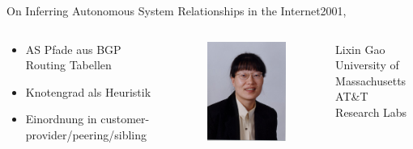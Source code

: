 \documentclass[ngerman,compress,hyperref={bookmarks}]{beamer}
\begin{document}
\begin{frame}{On Inferring Autonomous System Relationships in the Internet}{2001, \cite{Gao:2001:IAS:504611.504616}}
  \begin{columns}[c]
    \begin{column}{0.5\textwidth}
      \begin{itemize}
        \item AS Pfade aus BGP Routing Tabellen
        \item Knotengrad als Heuristik
        \item Einordnung in customer-provider/peering/sibling
      \end{itemize}
    \end{column}
    \begin{column}{0.1\textwidth}
      \begin{figure}
        \includegraphics[width=1\textwidth]{images/gao}
        \label{gao}
      \end{figure}
    \end{column}
    \begin{column}{0.3\textwidth}
      {\scriptsize Lixin Gao\\
      \vspace{0.1cm}
      University of Massachusetts\\
      AT\&T Research Labs}
    \end{column}
  \end{columns}
\end{frame}
\end{document}
